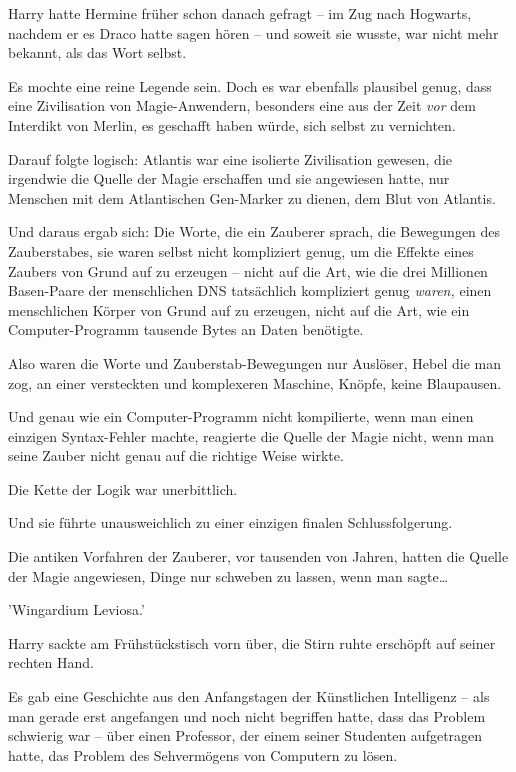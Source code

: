 {Harry hatte Hermine früher schon danach gefragt -- im Zug nach Hogwarts, nachdem er es Draco hatte sagen hören -- und soweit sie wusste, war nicht mehr bekannt, als das Wort selbst.

Es mochte eine reine Legende sein. Doch es war ebenfalls plausibel genug, dass eine Zivilisation von Magie-Anwendern, besonders eine aus der Zeit \emph{vor} dem Interdikt von Merlin, es geschafft haben würde, sich selbst zu vernichten.

Darauf folgte logisch: Atlantis war eine isolierte Zivilisation gewesen, die irgendwie die Quelle der Magie erschaffen und sie angewiesen hatte, nur Menschen mit dem Atlantischen Gen-Marker zu dienen, dem Blut von Atlantis.

Und daraus ergab sich: Die Worte, die ein Zauberer sprach, die Bewegungen des Zauberstabes, sie waren selbst nicht kompliziert genug, um die Effekte eines Zaubers von Grund auf zu erzeugen -- nicht auf die Art, wie die drei Millionen Basen-Paare der menschlichen DNS tatsächlich kompliziert genug \emph{waren,} einen menschlichen Körper von Grund auf zu erzeugen, nicht auf die Art, wie ein Computer-Programm tausende Bytes an Daten benötigte.

Also waren die Worte und Zauberstab-Bewegungen nur Auslöser, Hebel die man zog, an einer versteckten und komplexeren Maschine, Knöpfe, keine Blaupausen.

Und genau wie ein Computer-Programm nicht kompilierte, wenn man einen einzigen Syntax-Fehler machte, reagierte die Quelle der Magie nicht, wenn man seine Zauber nicht genau auf die richtige Weise wirkte.

Die Kette der Logik war unerbittlich.

Und sie führte unausweichlich zu einer einzigen finalen Schlussfolgerung.

Die antiken Vorfahren der Zauberer, vor tausenden von Jahren, hatten die Quelle der Magie angewiesen, Dinge nur schweben zu lassen, wenn man sagte…

'Wingardium Leviosa.'

Harry sackte am Frühstückstisch vorn über, die Stirn ruhte erschöpft auf seiner rechten Hand.

Es gab eine Geschichte aus den Anfangstagen der Künstlichen Intelligenz -- als man gerade erst angefangen und noch nicht begriffen hatte, dass das Problem schwierig war -- über einen Professor, der einem seiner Studenten aufgetragen hatte, das Problem des Sehvermögens von Computern zu lösen.

}
